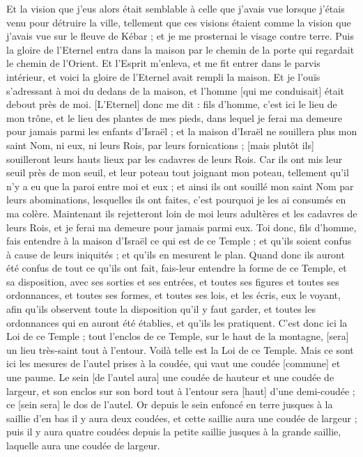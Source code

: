 \begin{multicols}{2}
Et la vision que j'eus alors était semblable à celle que j'avais vue lorsque j'étais venu pour détruire la ville, tellement que ces visions étaient comme la vision que j'avais vue sur le fleuve de Kébar ; et je me prosternai le visage contre terre.
Puis la gloire de l'Eternel entra dans la maison par le chemin de la porte qui regardait le chemin de l'Orient.
Et l'Esprit m'enleva, et me fit entrer dans le parvis intérieur, et voici la gloire de l'Eternel avait rempli la maison.
Et je l'ouïs s'adressant à moi du dedans de la maison, et l'homme [qui me conduisait] était debout près de moi.
[L'Eternel] donc me dit : fils d'homme, c'est ici le lieu de mon trône, et le lieu des plantes de mes pieds, dans lequel je ferai ma demeure pour jamais parmi les enfants d'Israël ; et la maison d'Israël ne souillera plus mon saint Nom, ni eux, ni leurs Rois, par leurs fornications ; [mais plutôt ils] souilleront leurs hauts lieux par les cadavres de leurs Rois.
Car ils ont mis leur seuil près de mon seuil, et leur poteau tout joignant mon poteau, tellement qu'il n'y a eu que la paroi entre moi et eux ; et ainsi ils ont souillé mon saint Nom par leurs abominations, lesquelles ils ont faites, c'est pourquoi je les ai consumés en ma colère.
Maintenant ils rejetteront loin de moi leurs adultères et les cadavres de leurs Rois, et je ferai ma demeure pour jamais parmi eux.
Toi donc, fils d'homme, fais entendre à la maison d'Israël ce qui est de ce Temple ; et qu'ils soient confus à cause de leurs iniquités ; et qu'ils en mesurent le plan.
Quand donc ils auront été confus de tout ce qu'ils ont fait, fais-leur entendre la forme de ce Temple, et sa disposition, avec ses sorties et ses entrées, et toutes ses figures et toutes ses ordonnances, et toutes ses formes, et toutes ses lois, et les écris, eux le voyant, afin qu'ils observent toute la disposition qu'il y faut garder, et toutes les ordonnances qui en auront été établies, et qu'ils les pratiquent.
C'est donc ici la Loi de ce Temple ; tout l'enclos de ce Temple, sur le haut de la montagne, [sera] un lieu très-saint tout à l'entour. Voilà telle est la Loi de ce Temple.
Mais ce sont ici les mesures de l'autel prises à la coudée, qui vaut une coudée [commune] et une paume. Le sein [de l'autel aura] une coudée de hauteur et une coudée de largeur, et son enclos sur son bord tout à l'entour sera [haut] d'une demi-coudée ; ce [sein sera] le dos de l'autel.
Or depuis le sein enfoncé en terre jusques à la saillie d'en bas il y aura deux coudées, et cette saillie aura une coudée de largeur ; puis il y aura quatre coudées depuis la petite saillie jusques à la grande saillie, laquelle aura une coudée de largeur.

\end{multicols}
